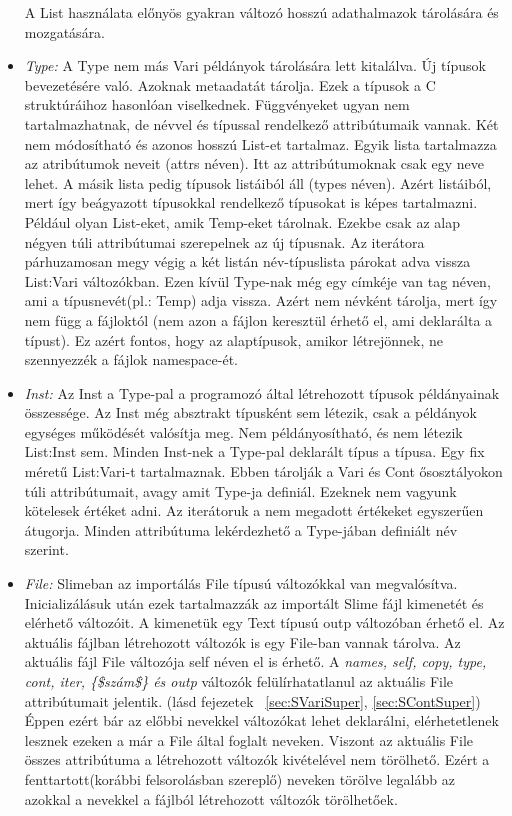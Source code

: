 \begin{itemize}
A List használata előnyös gyakran változó hosszú adathalmazok tárolására és mozgatására.
\item \emph{Type:} 
A Type nem más Vari példányok tárolására lett kitalálva.
Új típusok bevezetésére való.
Azoknak metaadatát tárolja.
Ezek a típusok a C struktúráihoz hasonlóan viselkednek.
Függvényeket ugyan nem tartalmazhatnak, de névvel és típussal rendelkező attribútumaik vannak.
Két nem módosítható és azonos hosszú List-et tartalmaz.
Egyik lista tartalmazza az atribútumok neveit (attrs néven).
Itt az attribútumoknak csak egy neve lehet.
A másik lista pedig típusok listáiból áll (types néven).
Azért listáiból, mert így beágyazott típusokkal rendelkező típusokat is képes tartalmazni. 
Például olyan List-eket, amik Temp-eket tárolnak.
Ezekbe csak az alap négyen túli attribútumai szerepelnek az új típusnak.
Az iterátora párhuzamosan megy végig a két listán név-típuslista párokat adva vissza List:Vari változókban.
Ezen kívül Type-nak még egy címkéje van tag néven, ami a típusnevét(pl.: Temp) adja vissza.
Azért nem névként tárolja, mert így nem függ a fájloktól (nem azon a fájlon keresztül érhető el, ami deklarálta a típust).
Ez azért fontos, hogy az alaptípusok, amikor létrejönnek, ne szennyezzék a fájlok namespace-ét.
\item \emph{Inst:} 
Az Inst a Type-pal a programozó által létrehozott típusok példányainak összessége.
Az Inst még absztrakt típusként sem létezik, csak a példányok egységes működését valósítja meg.
Nem példányosítható, és nem létezik List:Inst sem.
Minden Inst-nek a Type-pal deklarált típus a típusa.
Egy fix méretű List:Vari-t tartalmaznak.
Ebben tárolják a Vari és Cont ősosztályokon túli attribútumait, avagy amit Type-ja definiál.
Ezeknek nem vagyunk kötelesek értéket adni.
Az iterátoruk a nem megadott értékeket egyszerűen átugorja.
Minden attribútuma lekérdezhető a Type-jában definiált név szerint.
\item \emph{File:} 
Slimeban az importálás File típusú változókkal van megvalósítva.
Inicializálásuk után ezek tartalmazzák az importált Slime fájl kimenetét és elérhető változóit.
A kimenetük egy Text típusú outp változóban érhető el.
Az aktuális fájlban létrehozott változók is egy File-ban vannak tárolva.
Az aktuális fájl File változója self néven el is érhető.
A \textit{names, self, copy, type, cont, iter, \{\$szám\$\} és outp} változók felülírhatatlanul az aktuális File attribútumait jelentik.
(lásd fejezetek ~\ref{sec:SVariSuper}, \ref{sec:SContSuper})
Éppen ezért bár az előbbi nevekkel változókat lehet deklarálni, elérhetetlenek lesznek ezeken a már a File által foglalt neveken. 
Viszont az aktuális File összes attribútuma a létrehozott változók kivételével nem törölhető.
Ezért a fenttartott(korábbi felsorolásban szereplő) neveken törölve legalább az azokkal a nevekkel a fájlból létrehozott változók törölhetőek.
\end{itemize}


